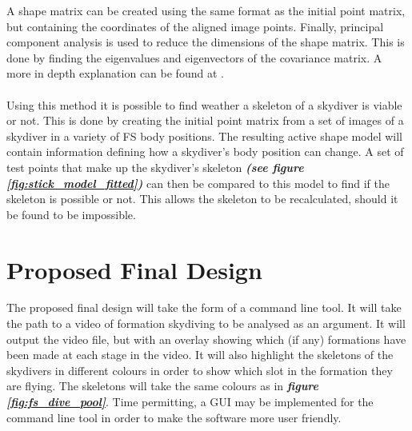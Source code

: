 \documentclass[a4paper, 12pt]{article}
\begin{document}
%
\noindent A shape matrix can be created using the same format as the initial point matrix, but containing the coordinates of the aligned image points.
Finally, principal component analysis is used to reduce the dimensions of the shape matrix. This is done by finding the eigenvalues and eigenvectors of the covariance matrix. A more in depth explanation can be found at \cite{icl_pca}.\\
\\
Using this method it is possible to find weather a skeleton of a skydiver is viable or not. This is done by creating the initial point matrix from a set of images of a skydiver in a variety of FS body positions. The resulting active shape model will contain information defining how a skydiver's body position can change. A set of test points that make up the skydiver's skeleton \textbf{\emph{(see figure \ref{fig:stick_model_fitted})}} can then be compared to this model to find if the skeleton is possible or not. This allows the skeleton to be recalculated, should it be found to be impossible.
%
\section{Proposed Final Design}
%
The proposed final design will take the form of a command line tool. It will take the path to a video of formation skydiving to be analysed as an argument. It will output the  video file, but with an overlay showing which (if any) formations have been made at each stage in the video. It will also highlight the skeletons of the skydivers in different colours in order to show which slot in the formation they are flying. The skeletons will take the same colours as in \textbf{\emph{figure \ref{fig:fs_dive_pool}}}. Time permitting, a GUI may be implemented for the command line tool in order to make the software more user friendly.\\
\end{document}
